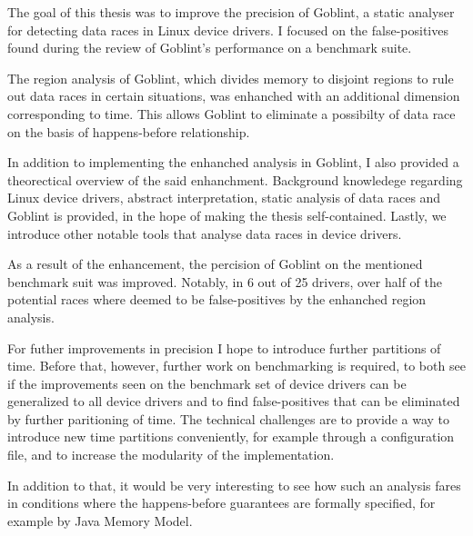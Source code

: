 \documentclass[..thesis.tex]{subfiles}
\begin{document}
The goal of this thesis was to improve the precision of Goblint, a static analyser for detecting data races in Linux device drivers.
I focused on the false-positives found during the review of Goblint's performance on a benchmark suite. 

The region analysis of Goblint, which divides memory to disjoint regions to rule out data races in certain situations, was enhanched with an additional dimension corresponding to time.
This allows Goblint to eliminate a possibilty of data race on the basis of happens-before relationship. 

In addition to implementing the enhanched analysis in Goblint, I also provided a theorectical overview of the said enhanchment.
Background knowledege regarding Linux device drivers, abstract interpretation, static analysis of data races and Goblint is provided,
in the hope of making the thesis self-contained. Lastly, we introduce other notable tools that analyse data races in device drivers.

As a result of the enhancement, the percision of Goblint on the mentioned benchmark suit was improved. Notably, in 6 out of 25 drivers,
over half of the potential races where deemed to be false-positives by the enhanched region analysis.
 
For futher improvements in precision I hope to introduce further partitions of time. Before that, however, further work on benchmarking is required,
to both see if the improvements seen on the benchmark set of device drivers can be generalized to all device drivers and to find false-positives that
can be eliminated by further paritioning of time. The technical challenges are to provide a way to introduce new time partitions conveniently,
for example through a configuration file, and to increase the modularity of the implementation.

In addition to that, it would be very interesting to see how such an analysis fares in conditions where the happens-before guarantees are formally specified, for example by Java Memory Model.
\end{document}

